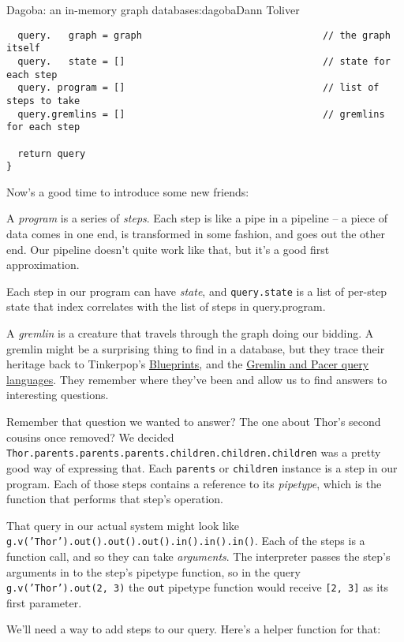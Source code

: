 \begin{aosachapter}{Dagoba: an in-memory graph database}{s:dagoba}{Dann Toliver}
\begin{verbatim}
  query.   graph = graph                                // the graph itself
  query.   state = []                                   // state for each step
  query. program = []                                   // list of steps to take  
  query.gremlins = []                                   // gremlins for each step

  return query
}
\end{verbatim}

Now's a good time to introduce some new friends:

A \emph{program} is a series of \emph{steps}. Each step is like a pipe
in a pipeline -- a piece of data comes in one end, is transformed in
some fashion, and goes out the other end. Our pipeline doesn't quite
work like that, but it's a good first approximation.

Each step in our program can have \emph{state}, and \texttt{query.state}
is a list of per-step state that index correlates with the list of steps
in query.program.

A \emph{gremlin} is a creature that travels through the graph doing our
bidding. A gremlin might be a surprising thing to find in a database,
but they trace their heritage back to Tinkerpop's
\href{http://euranova.eu/upl_docs/publications/an-empirical-comparison-of-graph-databases.pdf}{Blueprints},
and the
\href{http://edbt.org/Proceedings/2013-Genova/papers/workshops/a29-holzschuher.pdf}{Gremlin
and Pacer query languages}. They remember where they've been and allow
us to find answers to interesting questions.

Remember that question we wanted to answer? The one about Thor's second
cousins once removed? We decided
\texttt{Thor.parents.parents.parents.children.children.children} was a
pretty good way of expressing that. Each \texttt{parents} or
\texttt{children} instance is a step in our program. Each of those steps
contains a reference to its \emph{pipetype}, which is the function that
performs that step's operation.

That query in our actual system might look like
\texttt{g.v('Thor').out().out().out().in().in().in()}. Each of the steps
is a function call, and so they can take \emph{arguments}. The
interpreter passes the step's arguments in to the step's pipetype
function, so in the query \texttt{g.v('Thor').out(2, 3)} the
\texttt{out} pipetype function would receive \texttt{{[}2, 3{]}} as its
first parameter.

We'll need a way to add steps to our query. Here's a helper function for
that:


\end{aosachapter}
